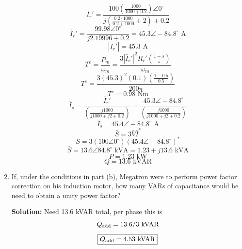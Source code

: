 \documentclass{article}
\begin{document}
\begin{enumerate}[label=(\alph*)]
$$\bar{I}_{r}' = \frac{100\left(\frac{1000}{1000+0.2}\right) \angle 0^{\circ}}{j\left(\frac{0.2 \cdot 1000}{0.2 + 1000} + 2\right) + 0.2} $$
$$\bar{I}_{r}' = \frac{99.98 \angle 0^{\circ}}{j2.19996 + 0.2} = 45.3\angle -84.8^{\circ}\text{ A} $$
$$|\bar{I}_r'| = 45.3 \text{ A}$$
$$T^e = \frac{P_m}{\omega_m} = \frac{3|\bar{I}_r'|^2R_r'\left(\frac{1-s}{s}\right)}{\omega_m}$$
$$T^e = \frac{3(45.3)^2(0.1)\left(\frac{1-0.5}{0.5}\right)}{200\pi}$$
$$\boxed{ T^e = 0.98\text{ Nm}}$$
$$\bar{I}_s = \frac{\bar{I}_r'}{\left(\frac{j1000}{j1000 + j2 + 0.2}\right)} = \frac{45.3\angle -84.8^{\circ}}{\left(\frac{j1000}{j1000 + j2 + 0.2}\right)}$$
$$\bar{I}_s = 45.4\angle -84.8^{\circ}\text{ A}$$
$$\bar{S} = 3\bar{V}\bar{I}^{\ast}$$
$$\bar{S} = 3(100\angle 0^{\circ})(45.4\angle -84.8^{\circ})^{\ast}$$
$$\bar{S} = 13.6\angle 84.8^{\circ} \text{ kVA} = 1.23 + j13.6 \text{ kVA}$$
$$\boxed{P = 1.23\text{ kW}}$$
$$\boxed{Q = 13.6\text{ kVAR}}$$
    \item {If, under the conditions in part (b), Megatron were to perform power factor correction on his induction motor, how many VARs of capacitance would he need to obtain a unity power factor?}

\textbf{Solution:}
Need 13.6 kVAR total, per phase this is
$$Q_{\rm add} = 13.6/3\text{ kVAR}$$
$$\boxed{Q_{\rm add} = 4.53\text{ kVAR}}$$
\end{enumerate}
\newpage %
\noindent 
\end{document}
